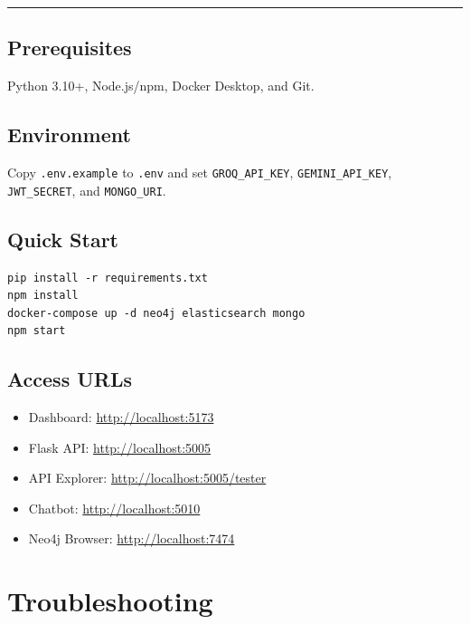 \documentclass[11pt,a4paper]{article}
\begin{document}
\vspace{0.3cm}\hrule\vspace{0.6cm}

\subsection{Prerequisites}

Python 3.10+, Node.js/npm, Docker Desktop, and Git.

\subsection{Environment}

Copy \texttt{.env.example} to \texttt{.env} and set \texttt{GROQ\_API\_KEY}, \texttt{GEMINI\_API\_KEY}, \texttt{JWT\_SECRET}, and \texttt{MONGO\_URI}.

\subsection{Quick Start}

\begin{lstlisting}
pip install -r requirements.txt
npm install
docker-compose up -d neo4j elasticsearch mongo
npm start
\end{lstlisting}

\subsection{Access URLs}

\begin{itemize}[leftmargin=1.5cm]
    \item Dashboard: \url{http://localhost:5173}
    \item Flask API: \url{http://localhost:5005}
    \item API Explorer: \url{http://localhost:5005/tester}
    \item Chatbot: \url{http://localhost:5010}
    \item Neo4j Browser: \url{http://localhost:7474}
\end{itemize}


\section{Troubleshooting}
\end{document}
